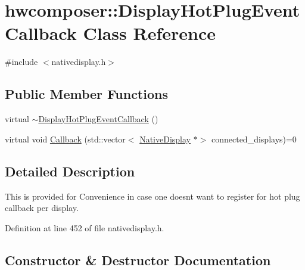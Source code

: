 \hypertarget{classhwcomposer_1_1DisplayHotPlugEventCallback}{}\section{hwcomposer\+:\+:Display\+Hot\+Plug\+Event\+Callback Class Reference}
\label{classhwcomposer_1_1DisplayHotPlugEventCallback}


{\ttfamily \#include $<$nativedisplay.\+h$>$}

\subsection*{Public Member Functions}
\begin{DoxyCompactItemize}
\item 
virtual \mbox{\hyperlink{classhwcomposer_1_1DisplayHotPlugEventCallback_aac65c3af5e35ca7b5865746503787fdb}{$\sim$\+Display\+Hot\+Plug\+Event\+Callback}} ()
\item 
virtual void \mbox{\hyperlink{classhwcomposer_1_1DisplayHotPlugEventCallback_aa0185bcd7a64dda124cd63ef8d0e46ec}{Callback}} (std\+::vector$<$ \mbox{\hyperlink{classhwcomposer_1_1NativeDisplay}{Native\+Display}} $\ast$$>$ connected\+\_\+displays)=0
\end{DoxyCompactItemize}


\subsection{Detailed Description}
This is provided for Convenience in case one doesnt want to register for hot plug callback per display. 

Definition at line 452 of file nativedisplay.\+h.



\subsection{Constructor \& Destructor Documentation}
\mbox{\label{classhwcomposer_1_1DisplayHotPlugEventCallback_aac65c3af5e35ca7b5865746503787fdb}} 
